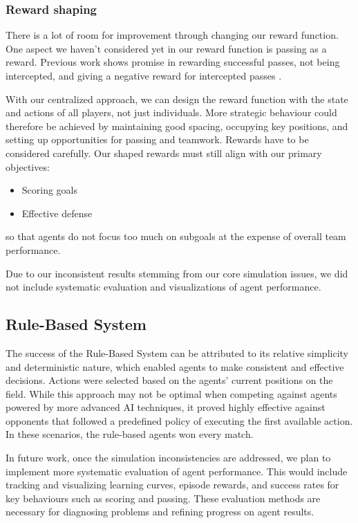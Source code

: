\subsubsection{Reward shaping}
There is a lot of room for improvement through changing our reward function.
One aspect we haven't considered yet in our reward function is passing as a reward.
Previous work shows promise in rewarding successful passes, not being intercepted, and giving a negative reward for intercepted passes
\cite{SRC2018Team}.

With our centralized approach, we can design the reward function with the state and actions of all players, not just individuals.
More strategic behaviour could therefore be achieved by maintaining good spacing, occupying key positions, and setting up opportunities for passing and teamwork.
Rewards have to be considered carefully. Our shaped rewards must still align with our primary objectives:
\begin{itemize}
    \item Scoring goals
    \item Effective defense
\end{itemize}
so that agents do not focus too much on subgoals at the expense of overall team performance.

Due to our inconsistent results stemming from our core simulation issues, we did not include systematic evaluation and visualizations of agent performance.

\subsection{Rule-Based System}
The success of the Rule-Based System can be attributed to its relative simplicity and deterministic nature, which enabled agents to make consistent and effective decisions. Actions were selected based on the agents’ current positions on the field. While this approach may not be optimal when competing against agents powered by more advanced AI techniques, it proved highly effective against opponents that followed a predefined policy of executing the first available action. In these scenarios, the rule-based agents won every match.

In future work, once the simulation inconsistencies are addressed, we plan to implement more systematic evaluation of agent performance. This would include tracking and visualizing learning curves, episode rewards, and success rates for key behaviours such as scoring and passing. These evaluation methods are necessary for diagnosing problems and refining progress on agent results.

